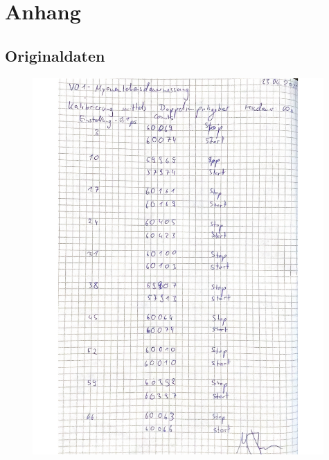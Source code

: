 \section{Anhang}
\label{sec:Anhang}
\subsection{Originaldaten}
%
 \begin{figure}[H]
   \centering
   \includegraphics[width=0.99\textwidth]{bilder/Messung_1_Myonen.pdf}
   \label{fig:Messungen_1}
 \end{figure}

